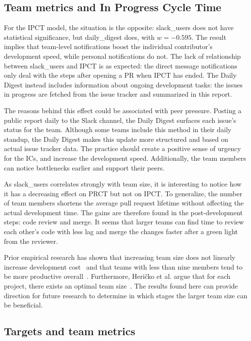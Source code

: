 \subsection{Team metrics and In Progress Cycle Time}

For the IPCT model, the situation is the opposite: slack\_users does not have statistical significance, but daily\_digest does, with $w=-0.595$. The result implies that team-level notifications boost the individual contributor's development speed, while personal notifications do not. The lack of relationship between slack\_users and IPCT is as expected: the direct message notifications only deal with the steps after opening a PR when IPCT has ended. The Daily Digest instead includes information about ongoing development tasks: the issues in progress are fetched from the issue tracker and summarized in this report. 

The reasons behind this effect could be associated with peer pressure. Posting a public report daily to the Slack channel, the Daily Digest surfaces each issue's status for the team. Although some teams include this method in their daily standup, the Daily Digest makes this update more structured and based on actual issue tracker data. The practice should create a positive sense of urgency for the ICs, and increase the development speed. Additionally, the team members can notice bottlenecks earlier and support their peers. 

As slack\_users correlates strongly with team size, it is interesting to notice how it has a decreasing effect on PRCT but not on IPCT. To generalize, the number of team members shortens the average pull request lifetime without affecting the actual development time. The gains are therefore found in the post-development steps: code review and merge. It seems that larger teams can find time to review each other's code with less lag and merge the changes faster after a green light from the reviewer. 

Prior empirical research has shown that increasing team size does not linearly increase development cost~\cite{pendharkar_relationship_2009} and that teams with less than nine members tend to be more productive overall~\cite{rodriguez_empirical_2012}. Furthermore, Heričko et al. argue that for each project, there exists an optimal team size~\cite{hericko_approach_2008}. The results found here can provide direction for future research to determine in which stages the larger team size can be beneficial.

\subsection{Targets and team metrics}

